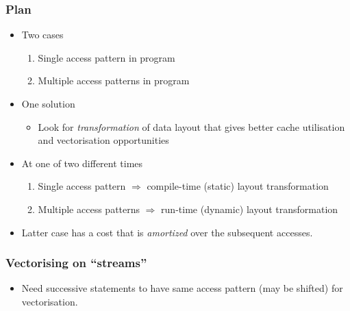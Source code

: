 \documentclass[presentation,aspectratio=43,10pt]{beamer}
\begin{document}
\begin{frame}
  \frametitle{Plan}
  \begin{itemize}
  \item Two cases
    \begin{enumerate}
    \item Single access pattern in program
    \item Multiple access patterns in program
    \end{enumerate}
  \item One solution
    \begin{itemize}  
    \item Look for \emph{transformation} of data layout that gives
      better cache utilisation and vectorisation opportunities
    \end{itemize}
  \item At one of two different times
    \begin{enumerate}
    \item Single access pattern $\Rightarrow$ compile-time (static)
      layout transformation
    \item Multiple access patterns $\Rightarrow$ run-time (dynamic)
      layout transformation
    \end{enumerate}
  \item Latter case has a cost that is \emph{amortized} over the
    subsequent accesses.
  \end{itemize}
\end{frame}

\begin{frame}
  \frametitle{Vectorising on ``streams''}
  \begin{itemize}
  \item Need successive statements to have same access pattern (may be
    shifted) for vectorisation.
  \end{itemize}
  \begin{center}
  \end{center}
\end{frame}
\end{document}
